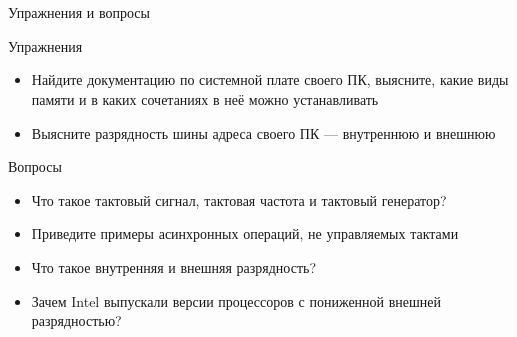 \documentclass[xetex,aspectratio=43]{beamer}
\begin{document}
\section*{}

\begin{frame}{Упражнения и вопросы}
        \begin{block}{Упражнения}
    \begin{itemize}
        \tightlist
        \item
        Найдите документацию по системной плате своего ПК, выясните, какие
        виды памяти и в каких сочетаниях в неё можно устанавливать
        \item
        Выясните разрядность шины адреса своего ПК --- внутреннюю и внешнюю
    \end{itemize}
\end{block}

\begin{block}{Вопросы}
    \begin{itemize}
        \tightlist
        \item
        Что такое тактовый сигнал, тактовая частота и тактовый генератор?
        \item
        Приведите примеры асинхронных операций, не управляемых тактами
        \item
        Что такое внутренняя и внешняя разрядность?
        \item
        Зачем Intel выпускали версии процессоров с пониженной внешней разрядностью?
    \end{itemize}
\end{block}
\end{frame}

\postamble
\end{document}
